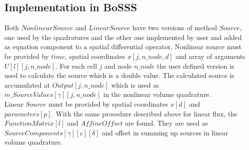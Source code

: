 \documentclass[BoSSSForSolvingConservationLaws.tex]{subfiles}
\begin{document}
\subsection*{Implementation in BoSSS}
Both $NonlinearSource$ and $LinearSource$ have two versions of method $Source$, one used by the quadratures and the other one implemented by user and added as equation component to a spatial differential operator. Nonlinear source must be provided by $time$, spatial coordinates $x[j,n\_node,d]$ and array of arguments $U[l][j, n\_node]$. For each cell $j$ and node $n\_node$ the user defined version is used to calculate the source which is a double value. The calculated source is accumulated at $Output[j,n\_node]$ which is used as $m\_SourceValues[\gamma][j, n\_node]$ in the nonlinear volume quadrature.\\
Linear $Source$ must be provided by spatial coordinates $x[d]$ and $parameters[p]$. With the same procedure described above for linear flux, the $FunctionMatrix[l]$ and $AffineOffset$ are found. They are used as $SourceComponents[\gamma][c][\delta]$ and offset in summing up sources in linear volume quadrature.
\end{document}
